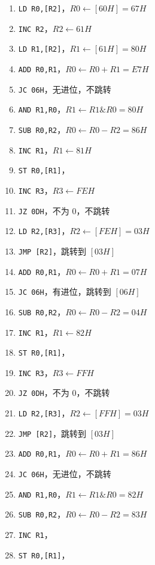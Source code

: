 \documentclass[12pt]{article}
\begin{document}
{        \begin{enumerate}
            \item \verb"LD R0,[R2]"，$R0\gets [60H]=67H$
            \item \verb"INC R2"，$R2\gets 61H$
            \item \verb"LD R1,[R2]"，$R1\gets [61H]=80H$
            \item \verb"ADD R0,R1"，$R0\gets R0+R1=E7H$
            \item \verb"JC 06H"，无进位，不跳转
            \item \verb"AND R1,R0"，$R1\gets R1\&R0=80H$
            \item \verb"SUB R0,R2"，$R0\gets R0-R2=86H$
            \item \verb"INC R1"，$R1\gets 81H$
            \item \verb"ST R0,[R1]"，
            \item \verb"INC R3"，$R3\gets FEH$
            \item \verb"JZ 0DH"，不为 $0$，不跳转
            \item \verb"LD R2,[R3]"，$R2\gets [FEH]=03H$
            \item \verb"JMP [R2]"，跳转到 $[03H]$
            \item \verb"ADD R0,R1"，$R0\gets R0+R1=07H$
            \item \verb"JC 06H"，有进位，跳转到 $[06H]$
            \item \verb"SUB R0,R2"，$R0\gets R0-R2=04H$
            \item \verb"INC R1"，$R1\gets 82H$
            \item \verb"ST R0,[R1]"，
            \item \verb"INC R3"，$R3\gets FFH$
            \item \verb"JZ 0DH"，不为 $0$，不跳转
            \item \verb"LD R2,[R3]"，$R2\gets [FFH]=03H$
            \item \verb"JMP [R2]"，跳转到 $[03H]$
            \item \verb"ADD R0,R1"，$R0\gets R0+R1=86H$
            \item \verb"JC 06H"，无进位，不跳转
            \item \verb"AND R1,R0"，$R1\gets R1\&R0=82H$
            \item \verb"SUB R0,R2"，$R0\gets R0-R2=83H$
            \item \verb"INC R1"，
            \item \verb"ST R0,[R1]"，

\end{enumerate}}
\end{document}
